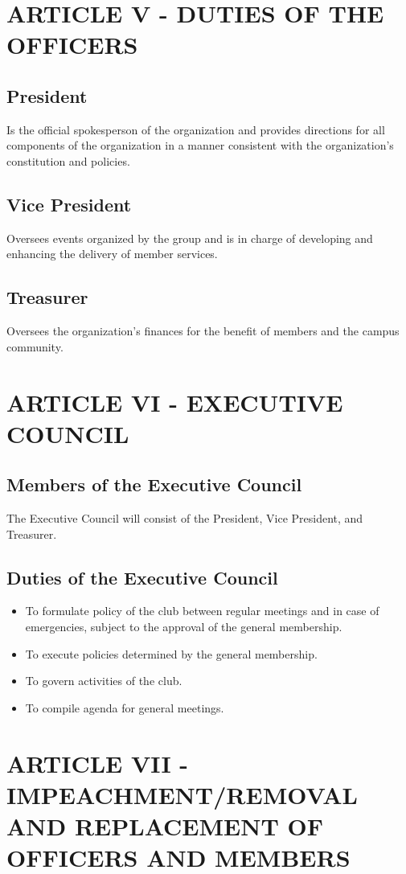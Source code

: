 \documentclass[11pt]{amsart}
\begin{document}
\section{ARTICLE V - DUTIES OF THE OFFICERS}
\subsection{President}
Is the official spokesperson of the organization and provides directions for all components of the organization in a manner consistent with the organization’s constitution and policies.
\subsection{Vice President}
Oversees events organized by the group and is in charge of developing and enhancing the delivery of member services.
\subsection{Treasurer}
Oversees the organization’s finances for the benefit of members and the campus community.

\section{ARTICLE VI - EXECUTIVE COUNCIL}
\subsection{Members of the Executive Council}
The Executive Council will consist of the President, Vice President, and Treasurer.

\subsection{Duties of the Executive Council}
\begin{itemize}
\item{To formulate policy of the club between regular meetings and in case of emergencies, subject to the approval of the general membership.}
\item{To execute policies determined by the general membership.}
\item{To govern activities of the club.}
\item{To compile agenda for general meetings.}
\end{itemize}

\section{ARTICLE VII - IMPEACHMENT/REMOVAL AND REPLACEMENT
OF OFFICERS AND MEMBERS}
\end{document}
